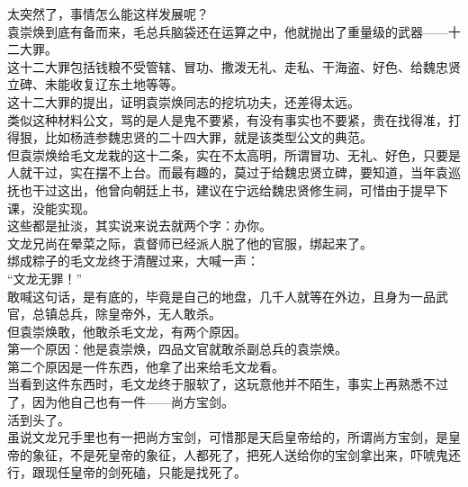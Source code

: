 \begin{multicols}{\theparacolNo}
太突然了，事情怎么能这样发展呢？\\

袁崇焕到底有备而来，毛总兵脑袋还在运算之中，他就抛出了重量级的武器——十二大罪。\\

这十二大罪包括钱粮不受管辖、冒功、撒泼无礼、走私、干海盗、好色、给魏忠贤立碑、未能收复辽东土地等等。\\

这十二大罪的提出，证明袁崇焕同志的挖坑功夫，还差得太远。\\

类似这种材料公文，骂的是人是鬼不要紧，有没有事实也不要紧，贵在找得准，打得狠，比如杨涟参魏忠贤的二十四大罪，就是该类型公文的典范。\\

但袁崇焕给毛文龙栽的这十二条，实在不太高明，所谓冒功、无礼、好色，只要是人就干过，实在摆不上台。而最有趣的，莫过于给魏忠贤立碑，要知道，当年袁巡抚也干过这出，他曾向朝廷上书，建议在宁远给魏忠贤修生祠，可惜由于提早下课，没能实现。\\

这些都是扯淡，其实说来说去就两个字：办你。\\

文龙兄尚在晕菜之际，袁督师已经派人脱了他的官服，绑起来了。\\

绑成粽子的毛文龙终于清醒过来，大喊一声：\\

“文龙无罪！”\\

敢喊这句话，是有底的，毕竟是自己的地盘，几千人就等在外边，且身为一品武官，总镇总兵，除皇帝外，无人敢杀。\\

但袁崇焕敢，他敢杀毛文龙，有两个原因。\\

第一个原因：他是袁崇焕，四品文官就敢杀副总兵的袁崇焕。\\

第二个原因是一件东西，他拿了出来给毛文龙看。\\

当看到这件东西时，毛文龙终于服软了，这玩意他并不陌生，事实上再熟悉不过了，因为他自己也有一件——尚方宝剑。\\

活到头了。\\

虽说文龙兄手里也有一把尚方宝剑，可惜那是天启皇帝给的，所谓尚方宝剑，是皇帝的象征，不是死皇帝的象征，人都死了，把死人送给你的宝剑拿出来，吓唬鬼还行，跟现任皇帝的剑死磕，只能是找死了。\\


\end{multicols}
